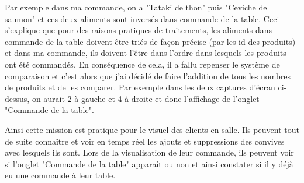 Par exemple dans ma commande, on a "Tataki de thon" puis "Ceviche de saumon" et ces deux aliments sont inversés dans commande de la table. Ceci s'explique que pour des raisons pratiques de traitements, les aliments dans commande de la table doivent être triés de façon précise (par les id des produits) et dans ma commande, ils doivent l'être dans l'ordre dans lesquels les produits ont été commandés. En conséquence de cela, il a fallu repenser le système de comparaison et c'est alors que j'ai décidé  de faire l'addition de tous les nombres de produits et de les comparer. Par exemple dans les deux captures d'écran ci-dessus, on aurait 2 à gauche et 4 à droite et donc l'affichage de l'onglet "Commande de la table".

Ainsi cette mission est pratique pour le visuel des clients en salle. Ils peuvent tout de suite connaître et voir en temps réel les ajouts et suppressions des convives avec lesquels ils sont. Lors de la visualisation de leur commande, ils peuvent voir si l'onglet "Commande de la table" apparaît ou non et ainsi constater si il y déjà eu une commande à leur table.

